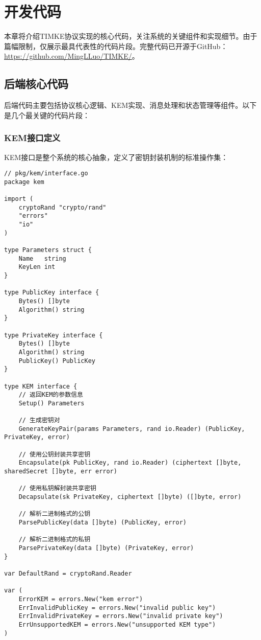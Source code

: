 \section{开发代码}

本章将介绍TIMKE协议实现的核心代码，关注系统的关键组件和实现细节。由于篇幅限制，仅展示最具代表性的代码片段。完整代码已开源于GitHub：\url{https://github.com/MingLLuo/TIMKE/}。

\subsection{后端核心代码}

后端代码主要包括协议核心逻辑、KEM实现、消息处理和状态管理等组件。以下是几个最关键的代码片段：

\subsubsection{KEM接口定义}

KEM接口是整个系统的核心抽象，定义了密钥封装机制的标准操作集：

\begin{verbatim}
// pkg/kem/interface.go
package kem

import (
    cryptoRand "crypto/rand"
    "errors"
    "io"
)

type Parameters struct {
    Name   string
    KeyLen int
}

type PublicKey interface {
    Bytes() []byte
    Algorithm() string
}

type PrivateKey interface {
    Bytes() []byte
    Algorithm() string
    PublicKey() PublicKey
}

type KEM interface {
    // 返回KEM的参数信息
    Setup() Parameters
    
    // 生成密钥对
    GenerateKeyPair(params Parameters, rand io.Reader) (PublicKey, PrivateKey, error)
    
    // 使用公钥封装共享密钥
    Encapsulate(pk PublicKey, rand io.Reader) (ciphertext []byte, sharedSecret []byte, err error)
    
    // 使用私钥解封装共享密钥
    Decapsulate(sk PrivateKey, ciphertext []byte) ([]byte, error)
    
    // 解析二进制格式的公钥
    ParsePublicKey(data []byte) (PublicKey, error)
    
    // 解析二进制格式的私钥
    ParsePrivateKey(data []byte) (PrivateKey, error)
}

var DefaultRand = cryptoRand.Reader

var (
    ErrorKEM = errors.New("kem error")
    ErrInvalidPublicKey = errors.New("invalid public key")
    ErrInvalidPrivateKey = errors.New("invalid private key")
    ErrUnsupportedKEM = errors.New("unsupported KEM type")
)
\end{verbatim}


